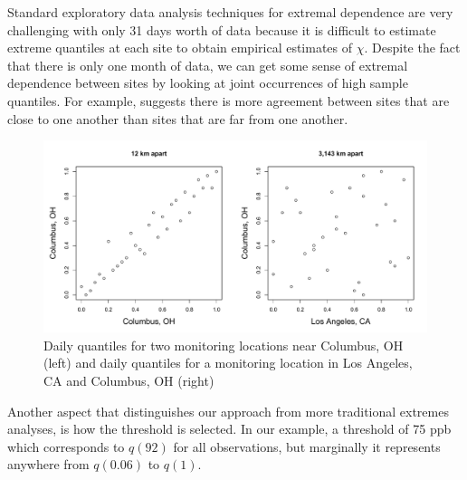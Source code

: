 \documentclass[useAMS,usenatbib,referee]{biom}
\begin{document}
Standard exploratory data analysis techniques for extremal dependence are very challenging with only 31 days worth of data because it is difficult to estimate extreme quantiles at each site to obtain empirical estimates of $\chi$.
Despite the fact that there is only one month of data, we can get some sense of extremal dependence between sites by looking at joint occurrences of high sample quantiles.
For example,  suggests there is more agreement between sites that are close to one another than sites that are far from one another.
\begin{figure}
  \centering
  \includegraphics[width=\linewidth]{plots/daily-quantiles-ozone.pdf}
  \caption{Daily quantiles for two monitoring locations near Columbus, OH (left) and daily quantiles for a monitoring location in Los Angeles, CA and Columbus, OH (right)}
  \label{stfig:bivariateozone}
\end{figure}
Another aspect that distinguishes our approach from more traditional extremes analyses, is how the threshold is selected.
In our example, a threshold of 75 ppb which corresponds to $q(92)$ for all observations, but marginally it represents anywhere from $q(0.06)$ to $q(1)$.

\end{document}
